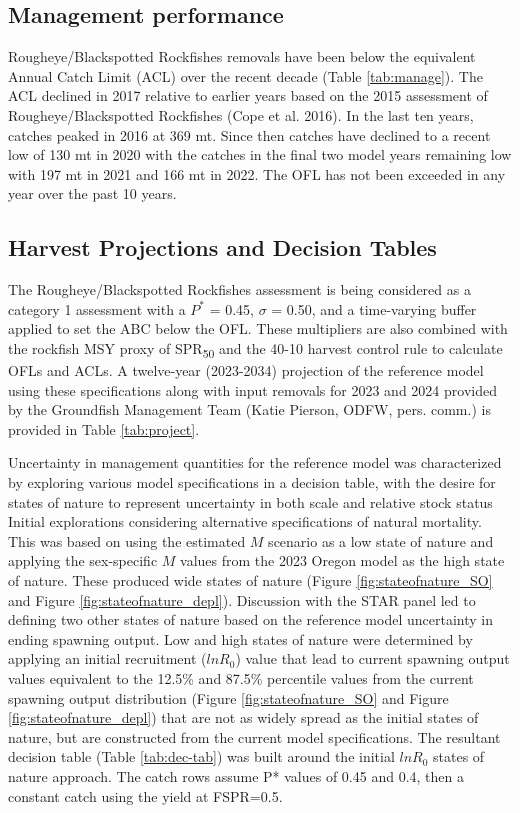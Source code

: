 \documentclass[
]{scrartcl}
\begin{document}
\subsection{Management performance}\label{management-performance-2}

Rougheye/Blackspotted Rockfishes removals have been below the equivalent
Annual Catch Limit (ACL) over the recent decade (Table
\ref{tab:manage}). The ACL declined in 2017 relative to earlier years
based on the 2015 assessment of Rougheye/Blackspotted Rockfishes (Cope
et al. 2016). In the last ten years, catches peaked in 2016 at 369 mt.
Since then catches have declined to a recent low of 130 mt in 2020 with
the catches in the final two model years remaining low with 197 mt in
2021 and 166 mt in 2022. The OFL has not been exceeded in any year over
the past 10 years.

\subsection{Harvest Projections and Decision
Tables}\label{harvest-projections-and-decision-tables-1}

The Rougheye/Blackspotted Rockfishes assessment is being considered as a
category 1 assessment with a \(P^*\) = 0.45, \(\sigma\) = 0.50, and a
time-varying buffer applied to set the ABC below the OFL. These
multipliers are also combined with the rockfish MSY proxy of
SPR\textsubscript{50} and the 40-10 harvest control rule to calculate
OFLs and ACLs. A twelve-year (2023-2034) projection of the reference
model using these specifications along with input removals for 2023 and
2024 provided by the Groundfish Management Team (Katie Pierson, ODFW,
pers. comm.) is provided in Table \ref{tab:project}.

Uncertainty in management quantities for the reference model was
characterized by exploring various model specifications in a decision
table, with the desire for states of nature to represent uncertainty in
both scale and relative stock status Initial explorations considering
alternative specifications of natural mortality. This was based on using
the estimated \(M\) scenario as a low state of nature and applying the
sex-specific \(M\) values from the 2023 Oregon model as the high state
of nature. These produced wide states of nature (Figure
\ref{fig:stateofnature_SO} and Figure \ref{fig:stateofnature_depl}).
Discussion with the STAR panel led to defining two other states of
nature based on the reference model uncertainty in ending spawning
output. Low and high states of nature were determined by applying an
initial recruitment (\(lnR_0\)) value that lead to current spawning
output values equivalent to the 12.5\% and 87.5\% percentile values from
the current spawning output distribution (Figure
\ref{fig:stateofnature_SO} and Figure \ref{fig:stateofnature_depl}) that
are not as widely spread as the initial states of nature, but are
constructed from the current model specifications. The resultant
decision table (Table \ref{tab:dec-tab}) was built around the initial
\(lnR_0\) states of nature approach. The catch rows assume P* values of
0.45 and 0.4, then a constant catch using the yield at FSPR=0.5.
\end{document}
